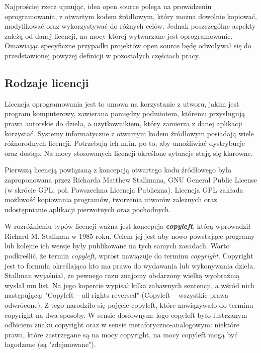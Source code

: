 \documentclass{article}
\begin{document}
Najprościej rzecz ujmując, idea open source polega na prowadzeniu oprogramowania, z otwartym kodem źródłowym, który można dowolnie kopiować, modyfikować oraz wykorzystywać do różnych celów. Jednak poszczególne aspekty zależą od danej licencji, na mocy której wytwarzane jest oprogramowanie. Omawiając specyficzne przypadki projektów open source będę odwoływał się do przedstawionej powyżej definicji w pozostałych częściach pracy.

\subsection{Rodzaje licencji}

\hspace{4mm} Licencja oprogramowania jest to umowa na korzystanie z utworu, jakim jest program komputerowy, zawierana pomiędzy podmiotem, któremu przysługują prawa autorskie do dzieła, a użytkownikiem, który zamierza z danej aplikacji korzystać\cite{wikipedia1}. Systemy informatyczne z otwartym kodem źródłowym posiadają wiele różnorodnych licencji. Potrzebują ich m.in. po to, aby umożliwiać dystrybucje oraz dostęp. Na mocy stosowanych licencji określone sytuacje stają się klarowne. 

Pierwszą licencją powiązaną z koncepcją otwartego kodu źródłowego była zaproponowana przez Richarda Matthew Stallmana, GNU General Public License (w skrócie GPL, pol. Powszechna Licencja Publiczna)\cite{Kotula}. Licencja GPL zakłada możliwość kopiowania programów, tworzenia utworów zależnych oraz udostępnianie aplikacji pierwotnych oraz pochodnych\cite{wikipedia2}.

W rozróżnieniu typów licencji ważna jest koncepcja \textbf{\emph{copyleft}}, którą wprowadził Richard M. Stallman w 1985 roku. Celem jej jest aby nowo powstające programy lub kolejne ich wersje były publikowane na tych samych zasadach. Warto podkreślić, że termin \emph{copyleft}, wprost nawiązuje do terminu \emph{copyright}. Copyright jest to formuła określająca kto ma prawo do wydawania lub wykonywania dzieła\cite{sjp}. Stallman wyjaśniał, że pewnego razu znajomy obdarzony wielką wyobraźnią wysłał mu list. Na jego kopercie wypisał kilka zabawnych sentencji, a wśród nich następującą: "Copyleft  – all rights reversed" (Copyleft  – wszystkie prawa odwrócone). Z tego narodziło się pojęcie copyleft, które nawiązywało do terminu copyright na dwa sposoby. W sensie dosłownym: logo copyleft było lustrzanym odbiciem znaku copyright oraz w sensie metaforyczno-analogowym: niektóre prawa, które zastrzegane są na mocy copyright, na mocy copyleft mogą być łagodzone (są "zdejmowane")\cite{Kotula}.
\end{document}
